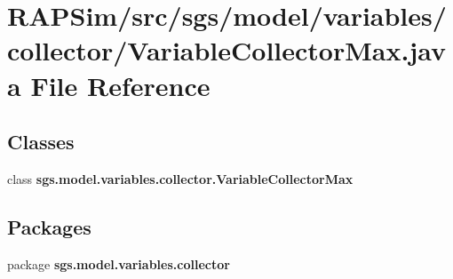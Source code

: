 \section{R\-A\-P\-Sim/src/sgs/model/variables/collector/\-Variable\-Collector\-Max.java File Reference}
\label{_variable_collector_max_8java}
\subsection*{Classes}
\begin{DoxyCompactItemize}
\item 
class {\bf sgs.\-model.\-variables.\-collector.\-Variable\-Collector\-Max}
\end{DoxyCompactItemize}
\subsection*{Packages}
\begin{DoxyCompactItemize}
\item 
package {\bf sgs.\-model.\-variables.\-collector}
\end{DoxyCompactItemize}
